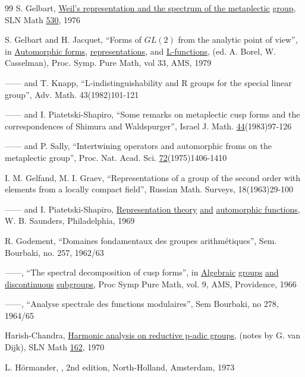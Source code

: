 \begin{thebibliography}{99}
 S. Gelbart, \underline{Weil's representation and the 
spectrum of the metaplectic} \underline{group},
SLN Math \underline{530}, 1976

 S. Gelbart and H. Jacquet,
``Forms of $GL(2)$ from the analytic
point of view'', in \underline{Automorphic forms},
\underline{representations}, and \underline{L-functions},
(ed. A. Borel, W. Casselman), Proc. Symp. Pure Math, vol 33, AMS, 1979

 ------ and T. Knapp, ``L-indistinguishability and R 
groups for the
special linear group'', Adv. Math. 43(1982)101-121

 ------ and I. Piatetski-Shapiro, ``Some remarks 
on metaplectic cusp
forms and the correspondences of Shimura and Waldspurger'', Israel 
J. Math.
\underline{44}(1983)97-126

 ------ and P. Sally, ``Intertwining operators and 
automorphic
froms on the metaplectic group'', Proc. Nat. Acad. Sci.
\underline{72}(1975)1406-1410

 I. M. Gelfand, M. I. Graev,
``Representations of a group of the second
order with elements from a locally compact field'', Russian Math. Surveys,
18(1963)29-100

 ------ and I. Piatetski-Shapiro, 
\underline{Representation
theory} \underline{and} \underline{automorphic functions}, W. B. Saunders,
Philadelphia, 1969

 R. Godement, ``Domaines fondamentaux des groupes 
arithm\'etiques'',
Sem. Bourbaki, no. 257, 1962/63

 ------, ``The spectral decomposition of cusp forms'', in
\underline{Algebraic} \underline{groups}
\underline{and} \underline{discontinuous} 
\underline{subgroups}, Proc Symp Pure Math, vol. 9, AMS, Providence, 1966

 ------, ``Analyse spectrale des functions modulaires'', 
Sem Bourbaki,
no 278, 1964/65

 Harish-Chandra, \underline{Harmonic analysis on 
reductive p-adic
groups}, (notes by G. van Dijk), SLN Math \underline{162}, 1970

 L. H\"ormander,
  
  
  ,
2nd edition, North-Holland,
Amsterdam, 1973


\end{thebibliography}
